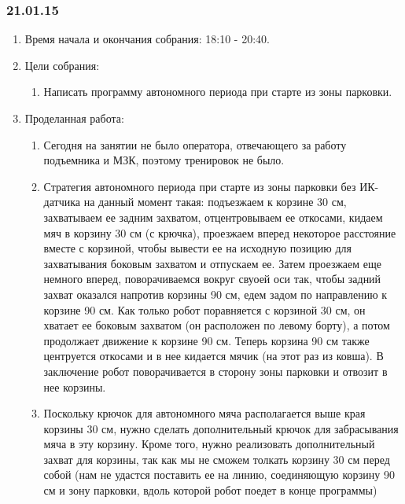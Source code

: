 \subsubsection{21.01.15}
\begin{enumerate}
	
	\item Время начала и окончания собрания: 18:10 - 20:40.
	
	\item Цели собрания: 
	\begin{enumerate}
		
		\item Написать программу автономного периода при старте из зоны парковки.
		
	\end{enumerate}

	\item Проделанная работа:
	\begin{enumerate}
		
		\item Сегодня на занятии не было оператора, отвечающего за работу подъемника и МЗК, поэтому тренировок не было.
		
		\item Стратегия автономного периода при старте из зоны парковки без ИК-датчика на данный момент такая: подъезжаем к корзине 30 см, захватываем ее задним захватом, отцентровываем ее откосами, кидаем мяч в корзину 30 см (с крючка), проезжаем вперед некоторое расстояние вместе с корзиной, чтобы вывести ее на исходную позицию для захватывания боковым захватом и отпускаем ее. Затем проезжаем еще немного вперед, поворачиваемся вокруг свуоей оси так, чтобы задний захват оказался напротив корзины 90 см, едем задом по направлению к корзине 90 см. Как только робот поравняется с корзиной 30 см, он хватает ее боковым захватом (он расположен по левому борту), а потом продолжает движение к корзине 90 см. Теперь корзина 90 см также центруется откосами и в нее кидается мячик (на этот раз из ковша). В заключение робот поворачивается в сторону зоны парковки и отвозит в нее корзины.
		
        \item Поскольку крючок для автономного мяча располагается выше края корзины 30 см, нужно сделать дополнительный крючок для забрасывания мяча в эту корзину. Кроме того, нужно реализовать дополнительный захват для корзины, так как мы не сможем толкать корзину 30 см перед собой (нам не удастся поставить ее на линию, соединяющую корзину 90 см и зону парковки, вдоль которой робот поедет в конце программы)
		

\end{enumerate}
\end{enumerate}
